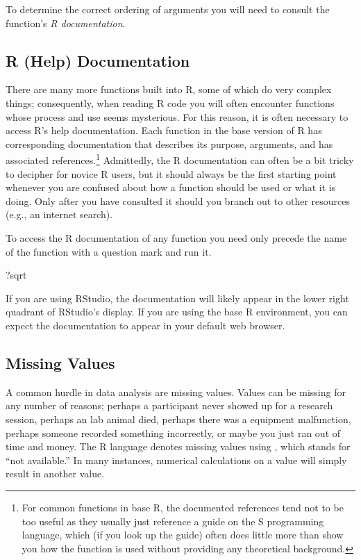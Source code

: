 \noindent
To determine the correct ordering of arguments you will need to consult the function's \textit{R documentation}.

\subsection{R (Help) Documentation}

There are many more functions built into R, some of which do very complex things; consequently, when reading R code you will often encounter functions whose process and use seems mysterious.  For this reason, it is often necessary to access R's help documentation. Each function in the base version of R has corresponding documentation that describes its purpose, arguments, and has associated references.\footnote{For common functions in base R, the documented references tend not to be too useful as they usually just reference a guide on the S programming language, which (if you look up the guide) often does little more than show you how the function is used without providing any theoretical background.} Admittedly, the R documentation can often be a bit tricky to decipher for novice R users, but it should always be the first starting point whenever you are confused about how a function should be used or what it is doing.  Only after you have consulted it should you branch out to other resources (e.g., an internet search).

To access the R documentation of any function you need only precede the name of the function with a question mark and run it.

\begin{inR}
?sqrt
\end{inR}

\vspace{1em}

\noindent If you are using RStudio, the documentation will likely appear in the lower right quadrant of RStudio's display. If you are using the base R environment, you can expect the documentation to appear in your default web browser.

\subsection{Missing Values}

A common hurdle in data analysis are missing values.  Values can be missing for any number of reasons; perhaps a participant never showed up for a research session, perhaps an lab animal died, perhaps there was a equipment malfunction, perhaps someone recorded something incorrectly, or maybe you just ran out of time and money. The R language denotes missing values using , which stands for ``not available.'' In many instances, numerical calculations on a  value will simply result in another  value.

